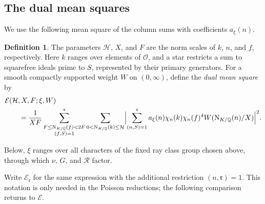 \documentclass[11pt,a4paper]{article}
\numberwithin{equation}{section}
\numberwithin{figure}{section}
\theoremstyle{definition}
\newtheorem{definition}[theorem]{Definition}
\theoremstyle{remark}
\newcommand{\Q}{\mathbb Q}
\newcommand{\NK}{\mathrm N_{K/\Q}}
\newcommand{\OO}{\mathcal O}
\newcommand{\E}{\mathcal E}
\begin{document}
\subsection{The dual mean squares} 
We use the following mean square of the column sums with
coefficients $a_\xi(n)$.

\begin{definition}
The parameters $\mathcal H$, $X$, and $F$ are the norm scales of
$k$, $n$, and $f$, respectively. Here $k$ ranges over elements of
$\OO$, and a star restricts a sum to squarefree ideals prime to $S$,
represented by their primary generators. For a smooth compactly
supported weight $W$ on $(0,\infty)$, define the \emph{dual mean square} by
\begin{equation}\label{eq:energy}
 \begin{aligned}
 &\E(\mathcal{H},X,F;\xi,W)\\
 &\qquad=\frac1{XF}
 \sum_{\substack{F\le\NK(f)<2F\\(f,S)=1}}^*\sum_{0<\NK(k)\le \mathcal{H}}
 \Bigl|\sum_{(n,S)=1}^*a_\xi(n)\chi_n(k)\chi_n(f)^4
                  W(\NK(n)/X)\Bigr|^2.
 \end{aligned}
\end{equation}
\end{definition}

Below, $\xi$ ranges over all characters of the fixed ray class group
chosen above, through which $\nu$, $G$, and $\mathcal R$ factor.

Write $\E_{\mathfrak r}$ for the same expression with the additional
restriction $(n,\mathfrak r)=1$. This notation is only needed in the
Poisson reductions; the following comparison returns to $\E$.
\end{document}
